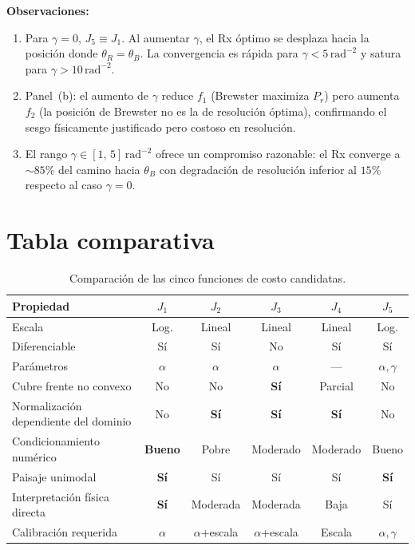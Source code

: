 \documentclass[11pt, a4paper]{article}
\begin{document}
\textbf{Observaciones:}
\begin{enumerate}
  \item Para $\gamma = 0$, $J_5 \equiv J_1$. Al aumentar $\gamma$, el Rx óptimo se
    desplaza hacia la posición donde $\theta_R = \theta_B$. La convergencia es rápida
    para $\gamma < 5\,\mathrm{rad}^{-2}$ y satura para $\gamma > 10\,\mathrm{rad}^{-2}$.

  \item Panel~(b): el aumento de $\gamma$ reduce $f_1$ (Brewster maximiza $P_r$) pero
    aumenta $f_2$ (la posición de Brewster no es la de resolución óptima), confirmando
    el sesgo físicamente justificado pero costoso en resolución.

  \item El rango $\gamma \in [1,\,5]\,\mathrm{rad}^{-2}$ ofrece un compromiso razonable:
    el Rx converge a ${\sim}85\%$ del camino hacia $\theta_B$ con degradación de
    resolución inferior al $15\%$ respecto al caso $\gamma = 0$.
\end{enumerate}

\section{Tabla comparativa}

\begin{table}[H]
  \centering
  \caption{Comparación de las cinco funciones de costo candidatas.}
  \label{tab:comparison}
  \renewcommand{\arraystretch}{1.35}

  \begin{tabular}{@{} p{4.8cm} c c c c c @{}}
    \toprule
    \textbf{Propiedad}
      & $J_1$ & $J_2$ & $J_3$ & $J_4$ & $J_5$ \\
    \midrule
    Escala
      & Log. & Lineal & Lineal & Lineal & Log. \\
    Diferenciable
      & Sí & Sí & No & Sí & Sí \\
    Parámetros
      & $\alpha$ & $\alpha$ & $\alpha$ & — & $\alpha,\gamma$ \\
    Cubre frente no convexo
      & No & No & \textbf{Sí} & Parcial & No \\
    Normalización dependiente del dominio
      & No & \textbf{Sí} & \textbf{Sí} & \textbf{Sí} & No \\
    Condicionamiento numérico
      & \textbf{Bueno} & Pobre & Moderado & Moderado & Bueno \\
    Paisaje unimodal
      & \textbf{Sí} & Sí & Sí & Sí & \textbf{Sí} \\
    Interpretación física directa
      & \textbf{Sí} & Moderada & Moderada & Baja & Sí \\
    Calibración requerida
      & $\alpha$ & $\alpha$+escala & $\alpha$+escala & Escala & $\alpha,\gamma$ \\
    \bottomrule
  \end{tabular}
\end{table}
\end{document}
